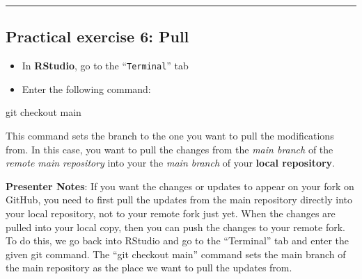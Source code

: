 \documentclass[
  letterpaper,
  DIV=11,
  numbers=noendperiod]{scrartcl}
\newenvironment{Shaded}{\begin{snugshade}}{\end{snugshade}}
\newcommand{\NormalTok}[1]{\textcolor[rgb]{0.00,0.23,0.31}{#1}}
\providecommand{\tightlist}{%
  \setlength{\itemsep}{0pt}\setlength{\parskip}{0pt}}
\begin{document}
\begin{center}\rule{0.5\linewidth}{0.5pt}\end{center}

\subsection{Practical exercise 6: Pull}\label{practical-exercise-6-pull}

\begin{itemize}
\tightlist
\item[$\square$]
  In \textbf{RStudio}, go to the ``\texttt{Terminal}'' tab
\item[$\square$]
  Enter the following command:
\end{itemize}

\begin{Shaded}
\begin{Highlighting}[]
\NormalTok{git checkout main}
\end{Highlighting}
\end{Shaded}

\begin{tcolorbox}[enhanced jigsaw, arc=.35mm, bottomrule=.15mm, bottomtitle=1mm, breakable, colback=white, colbacktitle=quarto-callout-note-color!10!white, colframe=quarto-callout-note-color-frame, coltitle=black, left=2mm, leftrule=.75mm, opacityback=0, opacitybacktitle=0.6, rightrule=.15mm, title=\textcolor{quarto-callout-note-color}{\faInfo}\hspace{0.5em}{\texttt{git\ checkout}}, titlerule=0mm, toprule=.15mm, toptitle=1mm]

This command sets the branch to the one you want to pull the
modifications from. In this case, you want to pull the changes from the
\emph{main branch} of the \emph{remote main repository} into your the
\emph{main branch} of your \textbf{local repository}.

\end{tcolorbox}

\textbf{Presenter Notes}: If you want the changes or updates to appear
on your fork on GitHub, you need to first pull the updates from the main
repository directly into your local repository, not to your remote fork
just yet. When the changes are pulled into your local copy, then you can
push the changes to your remote fork. To do this, we go back into
RStudio and go to the ``Terminal'' tab and enter the given git command.
The ``git checkout main'' command sets the main branch of the main
repository as the place we want to pull the updates from.
\end{document}

